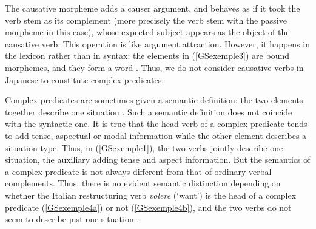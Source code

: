 \documentclass[output=paper
                ,modfonts
                ,nonflat
	        ,collection
	        ,collectionchapter
	        ,collectiontoclongg
 	        ,biblatex
                ,babelshorthands
                ,newtxmath
                ,draftmode
                ,colorlinks, citecolor=brown
]{./langsci/langscibook}
\begin{document}
{\begin{exe}
	\label{GSexemple3}
\end{exe}

The causative morpheme adds a causer argument, and behaves as if it took the verb stem as its complement (more precisely the verb stem with the passive morpheme in this case), whose expected subject appears as the object of the causative verb. This operation is like argument attraction. However, it happens in the lexicon rather than in syntax: the elements in (\ref{GSexemple3}) are bound morphemes, and they form a word \citep{manning1999lexical, gunji2012topics}. Thus, we do not consider causative verbs in Japanese to constitute complex predicates.

Complex predicates are sometimes given a semantic definition: the two elements together describe one situation \citep{butt1995structure}. Such a semantic definition does not coincide with the syntactic one. It is true that the head verb of a complex predicate tends to add tense, aspectual or modal information while the other element describes a situation type. Thus, in (\ref{GSexemple1}), the two verbs jointly describe one situation, the auxiliary adding tense and aspect information. But the semantics of a complex predicate is not always different from that of ordinary verbal complements. Thus, there is no evident semantic distinction depending on whether the Italian restructuring verb \textit{volere} (`want') is the head of a complex predicate (\ref{GSexemple4a}) or not (\ref{GSexemple4b}), and the two verbs do not seem to describe just one situation \citep{Monachesi98a}.  

\begin{exe}
	\ex \label{GSexemple4} 
	\begin{xlist}
		
		\label{GSexemple4a}
		
		\label{GSexemple4b} 
		

\end{xlist}
\end{exe}}
\end{document}
